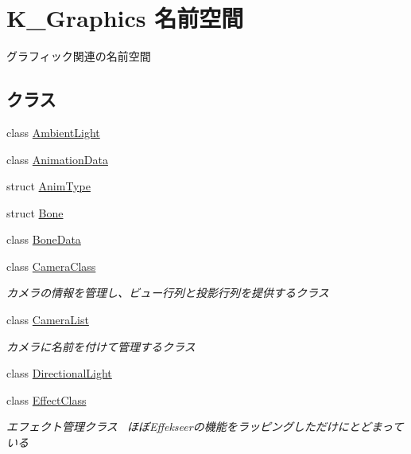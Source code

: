 \hypertarget{namespace_k___graphics}{}\section{K\+\_\+\+Graphics 名前空間}
\label{namespace_k___graphics}


グラフィック関連の名前空間~\newline
 


\subsection*{クラス}
\begin{DoxyCompactItemize}
\item 
class \mbox{\hyperlink{class_k___graphics_1_1_ambient_light}{Ambient\+Light}}
\item 
class \mbox{\hyperlink{class_k___graphics_1_1_animation_data}{Animation\+Data}}
\item 
struct \mbox{\hyperlink{struct_k___graphics_1_1_anim_type}{Anim\+Type}}
\item 
struct \mbox{\hyperlink{struct_k___graphics_1_1_bone}{Bone}}
\item 
class \mbox{\hyperlink{class_k___graphics_1_1_bone_data}{Bone\+Data}}
\item 
class \mbox{\hyperlink{class_k___graphics_1_1_camera_class}{Camera\+Class}}
\begin{DoxyCompactList}\small\item\em カメラの情報を管理し、ビュー行列と投影行列を提供するクラス \end{DoxyCompactList}\item 
class \mbox{\hyperlink{class_k___graphics_1_1_camera_list}{Camera\+List}}
\begin{DoxyCompactList}\small\item\em カメラに名前を付けて管理するクラス \end{DoxyCompactList}\item 
class \mbox{\hyperlink{class_k___graphics_1_1_directional_light}{Directional\+Light}}
\item 
class \mbox{\hyperlink{class_k___graphics_1_1_effect_class}{Effect\+Class}}
\begin{DoxyCompactList}\small\item\em エフェクト管理クラス~\newline
ほぼ\+Effekseerの機能をラッピングしただけにとどまっている \end{DoxyCompactList}\item 

\end{DoxyCompactItemize}
